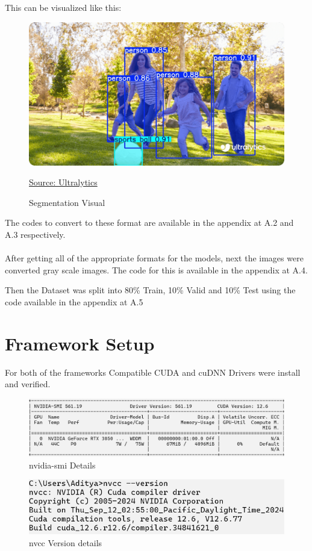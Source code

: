 This can be visualized like this:

\begin{figure}[H]
    \centering
    \includegraphics[width=0.5\linewidth]{figures/seggormat.png}
    \caption{Segmentation Visual} \href{https://www.ultralytics.com/blog/how-to-use-ultralytics-yolo11-for-instance-segmentation}{Source: Ultralytics}
    \label{fig:segvisual}
\end{figure}


The codes to convert to these format are available in the appendix at A.2 and A.3 respectively.
\\
\\
After getting all of the appropriate formats for the models, next the images were converted gray scale images. The code for this is available in the appendix at A.4.

Then the Dataset was split into 80\% Train, 10\% Valid and 10\% Test using the code available in the appendix at A.5

\section{Framework Setup}

For both of the frameworks Compatible CUDA and cuDNN Drivers were install and verified.

\begin{figure}[H]
    \centering
    \includegraphics[width=0.8\linewidth]{figures/nvidiasmi.png}
    \caption{nvidia-smi Details}
\end{figure}

\begin{figure}[H]
    \centering
    \includegraphics[width=0.5\linewidth]{figures/nvcc.png}
    \caption{nvcc Version details}
\end{figure}


